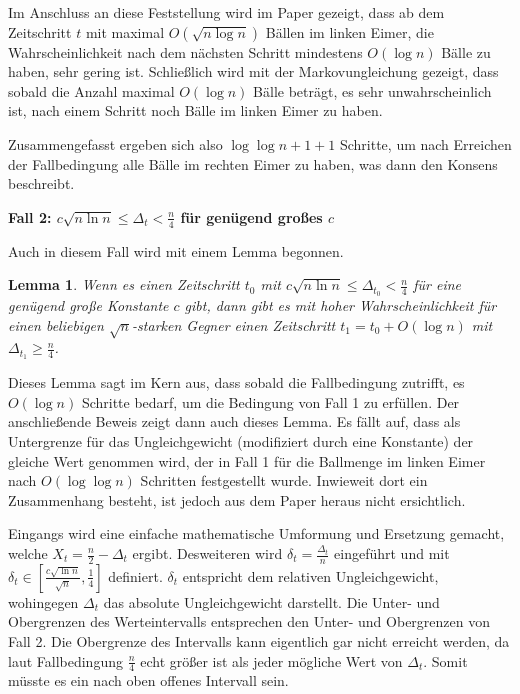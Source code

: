 \documentclass[12pt,ngerman,a4paper]{scrartcl}
\theoremstyle{plain}
\newtheorem{lemma}[theorem]{Lemma}
\theoremstyle{definition}
\theoremstyle{remark}
\begin{document}
Im Anschluss an diese Feststellung wird im Paper gezeigt, dass ab dem Zeitschritt
$t$ mit maximal $O(\sqrt{n \log n})$ Bällen im linken Eimer, die Wahrscheinlichkeit
nach dem nächsten Schritt mindestens $O(\log n)$ Bälle zu haben, sehr gering ist.
Schließlich wird mit der Markovungleichung gezeigt, dass sobald die Anzahl maximal
$O(\log n)$ Bälle beträgt, es sehr unwahrscheinlich ist, nach einem Schritt noch
Bälle im linken Eimer zu haben.

Zusammengefasst ergeben sich also $\log \log n + 1 + 1$ Schritte, um nach Erreichen
der Fallbedingung alle Bälle im rechten Eimer zu haben, was dann den Konsens
beschreibt.

\textbf{Fall 2: $c \sqrt{n \ln n} \leq \Delta_t < \frac{n}{4}$ für genügend großes
 $c$}

Auch in diesem Fall wird mit einem Lemma begonnen.

\begin{lemma}
Wenn es einen Zeitschritt $t_0$ mit $c\sqrt{n \ln n} \leq \Delta_{t_0} < \frac{n}{4}$
für eine genügend große Konstante $c$ gibt, dann gibt es mit hoher Wahrscheinlichkeit
für einen beliebigen $\sqrt{n}$-starken Gegner einen Zeitschritt
$t_1 = t_0 + O(\log n)$ mit $\Delta_{t_1} \geq \frac{n}{4}$.
\end{lemma}

Dieses Lemma sagt im Kern aus, dass sobald die Fallbedingung zutrifft, es
$O(\log n)$ Schritte bedarf, um die Bedingung von Fall 1 zu erfüllen. Der
anschließende Beweis zeigt dann auch dieses Lemma. Es fällt auf, dass als
Untergrenze für das Ungleichgewicht (modifiziert durch eine Konstante) der gleiche
Wert genommen wird, der in Fall 1 für die Ballmenge im linken Eimer nach
$O(\log \log n)$ Schritten festgestellt wurde. Inwieweit dort ein Zusammenhang
besteht, ist jedoch aus dem Paper heraus nicht ersichtlich.

Eingangs wird eine einfache mathematische Umformung und Ersetzung gemacht,
welche $X_t = \frac{n}{2} - \Delta_t$ ergibt. Desweiteren wird
$\delta_t = \frac{\Delta_t}{n}$ eingeführt und mit
$\delta_t \in \left[\frac{c\sqrt{\ln n}}{\sqrt{n}}, \frac{1}{4} \right]$
definiert. $\delta_t$ entspricht dem relativen Ungleichgewicht, wohingegen
$\Delta_t$ das absolute Ungleichgewicht darstellt. Die Unter- und Obergrenzen
des Werteintervalls entsprechen den Unter- und Obergrenzen von Fall 2.
Die Obergrenze des Intervalls kann eigentlich gar nicht
erreicht werden, da laut Fallbedingung $\frac{n}{4}$ echt größer ist als jeder
mögliche Wert von $\Delta_t$. Somit müsste es ein nach oben offenes Intervall
sein.
\end{document}

